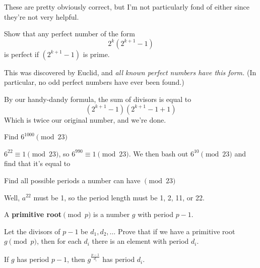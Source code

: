 \documentclass[12pt]{scrartcl}
\begin{document}
\begin{exercise}
	These are pretty obviously correct, but I'm not particularly fond of either since they're not very helpful.
\end{exercise}

\setcounter{exercise}{14}

\begin{exercise}
	Show that any perfect number of the form
	\[2^k\left(2^{k+1}-1\right)\]
	is perfect if $(2^{k+1} - 1)$ is prime.

	This was discovered by Euclid, and \emph{all known perfect numbers have this form.} (In particular, no odd perfect numbers have ever been found.)
	\begin{soln}
		By our handy-dandy formula,
		the sum of divisors is equal to
		\[(2^{k+1} - 1)(2^{k+1} - 1 + 1)\]
		Which is twice our original number, and we're done.
	\end{soln}
\end{exercise}

\setcounter{exercise}{18}

\begin{exercise}
	Find $6^{1000} \pmod{23}$
	\begin{soln}
		$6^{22} \equiv 1 \pmod{23}$, so $6^{990} \equiv 1 \pmod{23}$. 
		We then bash out $6^{10} \pmod{23}$ and find that it's equal to 
	\end{soln}
\end{exercise}

\begin{exercise}
	Find all possible periods a number can have $\pmod{23}$
	\begin{soln}
		Well, $a^{22}$ must be 1, so the period length must be 1, 2, 11, or 22.
	\end{soln}
\end{exercise}
\begin{definition*}
	A \textbf{primitive root$\pmod{p}$} is a number $g$ with period $p-1$.
\end{definition*}
\begin{exercise}
	Let the divisors of $p-1$ be $d_1, d_2,\dots$ 
	Prove that if we have a primitive root $g \pmod{p}$, then for each $d_i$ 
	there is an element with period $d_i$.
	\begin{soln}
		If $g$ has period $p-1$, then $g^{\frac{p-1}{d_i}}$ has period $d_i$.
	\end{soln}
\end{exercise}

\setcounter{exercise}{23}
\end{document}
